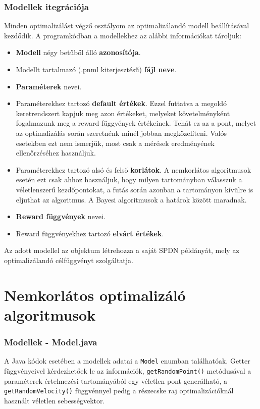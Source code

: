 \subsubsection{Modellek itegrációja}
Minden optimalizálást végző osztályom az optimalizálandó modell beállításával kezdődik. A programkódban a modellekhez az alábbi információkat tároljuk:
\begin{itemize}
	\item \textbf{Modell} négy betűből álló \textbf{azonosítója}.
	\item Modellt tartalmazó (.pnml kiterjesztésű) \textbf{fájl neve}.
	\item \textbf{Paraméterek} nevei.
	\item Paraméterekhez tartozó \textbf{default értékek}. Ezzel futtatva a megoldó keretrendszert kapjuk meg azon értékeket, melyeket követelményként fogalmazunk meg a reward függvények értékeinek. Tehát ez az a pont, melyet az optimalizálás során szeretnénk minél jobban megközelíteni. Valós esetekben ezt nem ismerjük, most csak a mérések eredményének ellenőrzéséhez használjuk.
	\item Paraméterekhez tartozó alsó és felső \textbf{korlátok}. A nemkorlátos algoritmusok esetén ezt csak ahhoz használjuk, hogy milyen tartományban válasszuk a véletlenszerű kezdőpontokat, a futás során azonban a tartományon kívülre is eljuthat az algoritmus. A Bayesi algoritmusok a határok között maradnak.
	\item \textbf{Reward függvények} nevei.
	\item Reward függvényekhez tartozó \textbf{elvárt értékek}.
\end{itemize}

Az adott modellel az objektum létrehozza a saját SPDN példányát, mely az optimalizálandó célfüggvényt szolgáltatja.

\section{Nemkorlátos optimalizáló algoritmusok}

\subsubsection{Modellek - Model.java}
A Java kódok esetében a modellek adatai a \texttt{Model} enumban találhatóak. Getter függvényeivel kérdezhetőek le az információk, \texttt{getRandomPoint()} metódusával a paraméterek értelmezési tartományából egy véletlen pont generálható, a \texttt{getRandomVelocity()} függvénnyel pedig a részecske raj optimalizációknál használt véletlen sebességvektor.

